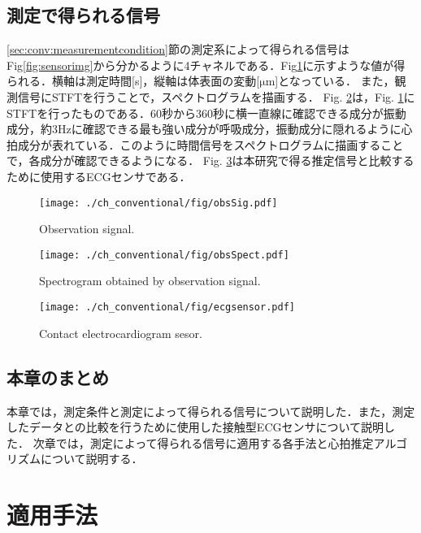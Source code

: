 \section{測定で得られる信号}
\label{sec:conv:signal}
\ref{sec:conv:measurementcondition}節の測定系によって得られる信号はFig\ref{fig:sensorimg}から分かるように4チャネルである．Fig\ref{fig:obssig}に示すような値が得られる．横軸は測定時間[s]，縦軸は体表面の変動[$\mathrm{\mu}$m]となっている．
また，観測信号にSTFTを行うことで，スペクトログラムを描画する．
Fig. \ref{fig:obsspect}は，Fig. \ref{fig:obssig}にSTFTを行ったものである．60秒から360秒に横一直線に確認できる成分が振動成分，約3Hzに確認できる最も強い成分が呼吸成分，振動成分に隠れるように心拍成分が表れている．このように時間信号をスペクトログラムに描画することで，各成分が確認できるようになる．
Fig. \ref{fig:ecgsensor}は本研究で得る推定信号と比較するために使用するECGセンサである．

\begin{figure}[b]
\centering
\texttt{[image: ./ch\_conventional/fig/obsSig.pdf]}
\caption{Observation signal.}
\label{fig:obssig}
\end{figure}

\begin{figure}[tb]
\centering
\texttt{[image: ./ch\_conventional/fig/obsSpect.pdf]}
\caption{Spectrogram obtained by observation signal.}
\label{fig:obsspect}
\end{figure}

\begin{figure}[tb]
\centering
\texttt{[image: ./ch\_conventional/fig/ecgsensor.pdf]}
\caption{Contact electrocardiogram sesor.}
\label{fig:ecgsensor}
\end{figure}

\section{本章のまとめ}
本章では，測定条件と測定によって得られる信号について説明した．また，測定したデータとの比較を行うために使用した接触型ECGセンサについて説明した．
次章では，測定によって得られる信号に適用する各手法と心拍推定アルゴリズムについて説明する．


\chapter{適用手法}
\label{chap:methods}

